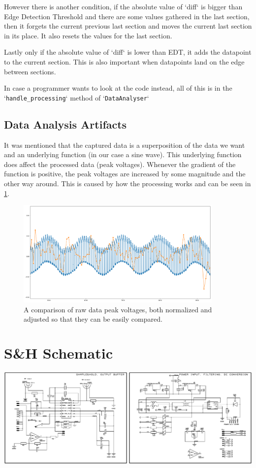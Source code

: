 \documentclass[a4paper, 10pt]{article}
\begin{document}
However there is another condition, if the absolute value of `diff` is bigger than Edge Detection Threshold and there are some values gathered in the last section, then it forgets the current previous last section and moves the current last section in its place.
It also resets the values for the last section.

Lastly only if the absolute value of `diff` is lower than EDT, it adds the datapoint to the current section.
This is also important when datapoints land on the edge between sections.

In case a programmer wants to look at the code instead, all of this is in the `\lstinline{handle_processing}` method of `\lstinline{DataAnalyser}`

\subsection{Data Analysis Artifacts}
It was mentioned that the captured data is a superposition of the data we want and an underlying function (in our case a sine wave).
This underlying function does affect the processed data (peak voltages).
Whenever the gradient of the function is positive, the peak voltages are increased by some magnitude and the other way around.
This is caused by how the processing works and can be seen in \cref{fig:soft-ys-pys-corr}.

\begin{figure}[H]
    \centering
    \includegraphics[width=0.9\textwidth]{../images/soft-ys-pys-corr.png}
    \caption{A comparison of raw data peak voltages, both normalized and adjusted so that they can be easily compared.}
    \label{fig:soft-ys-pys-corr}
\end{figure}

\vspace{10em}
\appendix

\section{S\&H Schematic}\label{sec:sample-hold-schema}
\includegraphics[width=\textwidth]{../appendices/S&H_Scheme.pdf}
\end{document}
